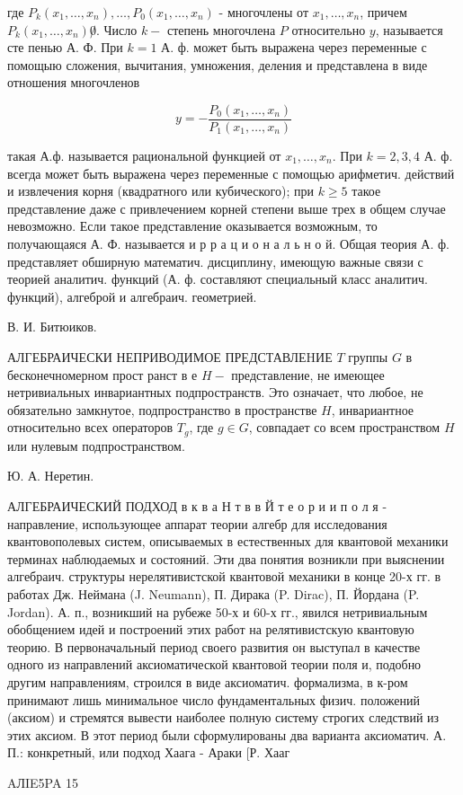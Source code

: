 \documentclass[10pt]{article}
\begin{document}
где $P_{k}\left(x_{1}, \ldots, x_{n}\right), \ldots, P_{0}\left(x_{1}, \ldots, x_{n}\right)$ - многочлены от $x_{1}, \ldots, x_{n}$, причем $P_{k}\left(x_{1}, \ldots, x_{n}\right) \not 0$. Число $k-$ степень многочлена $P$ относительно $y$, называется сте пенью А. Ф. При $k=1$ А. ф. может быть выражена через переменные с помощыю сложения, вычитания, умножения, деления и представлена в виде отношения многочленов



\[

y=-\frac{P_{0}\left(x_{1}, \ldots, x_{n}\right)}{P_{1}\left(x_{1}, \ldots, x_{n}\right)}

\]



такая А.ф. называется рациональной функцией от $x_{1}, \ldots, x_{n}$. При $k=2,3,4$ А. ф. всегда может быть выражена через переменные с помощью арифметич. действий и извлечения корня (квадратного или кубического); при $k \geqslant 5$ такое представление даже с привлечением корней степени выше трех в общем случае невозможно. Если такое представление оказывается возможным, то получающаяся А. Ф. называется и р р а ц и о н а л ь н о й. Общая теория А. ф. представляет обширную математич. дисциплину, имеющую важные связи с теорией аналитич. функций (А. ф. составляют специальный класс аналитич. функций), алгеброй и алгебраич. геометрией.



В. И. Битюиков.



АЛГЕБРАИЧЕСКИ НЕПРИВОДИМОЕ ПРЕДСТАВЛЕHИЕ $T$ группы $G$ в бесконечномерном прост ранст в е $H-$ представление, не имеющее нетривиальных инвариантных подпространств. Это означает, что любое, не обязательно замкнутое, подпространство в пространстве $H$, инвариантное относительно всех операторов $T_{g}$, где $g \in G$, совпадает со всем пространством $H$ или нулевым подпространством.



Ю. А. Неретин.



АЛГЕБРАИЧЕСКИЙ ПОДХОД в к в а Н т в в Й т е о р и и п о л я - направление, использующее аппарат теории алгебр для исследования квантовополевых систем, описываемых в естественных для квантовой механики терминах наблюдаемых и состояний. Эти два понятия возникли при выяснении алгебраич. структуры нерелятивистской квантовой механики в конце 20-х гг. в работах Дж. Неймана (J. Neumann), П. Дирака (P. Dirac), П. Йордана (P. Jordan). А. п., возникший на рубеже 50-х и 60-х гг., явился нетривиальным обобщением идей и построений этих работ на релятивистскую квантовую теорию. В первоначальный период своего развития он выступал в качестве одного из направлений аксиоматической квантовой теории поля и, подобно другим направлениям, строился в виде аксиоматич. формализма, в к-ром принимают лишь минимальное число фундаментальных физич. положений (аксиом) и стремятся вывести наиболее полную систему строгих следствий из этих аксиом. В этот период были сформулированы два варианта аксиоматич. А. П.: конкретный, или подход Хаага - Араки [Р. Хааг



AЛIE5PA 15
\end{document}
